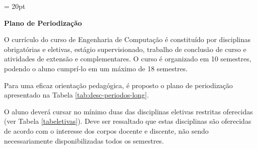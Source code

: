 \documentclass[oneside,envcountsame,envcountchap,openany]{svmono}
\begin{document}
\thispagestyle{firstpage} %
\headsep = 20pt
\setlength{\tabcolsep}{5pt} %
\vspace*{2.0cm}

\pagestyle{plain} %

\begin{center}
  \textbf{\LARGE Plano de Periodização}
\end{center}
\vspace*{0.5cm}

O currículo do curso de Engenharia de Computação é constituído por disciplinas obrigatórias e eletivas, estágio supervisionado, trabalho de conclusão de curso e atividades de extensão e complementares. O curso é organizado em 10 semestres, podendo o aluno cumprí-lo em um máximo de 18 semestres.

Para uma eficaz orientação pedagógica, é proposto o plano de periodização apresentado na Tabela \ref{tab:desc-periodos-long}.

O aluno deverá cursar no mínimo duas das disciplinas eletivas restritas oferecidas (ver Tabela \ref{tabeletivas}). Deve ser
ressaltado que estas disciplinas são oferecidas de acordo com o interesse dos corpos
docente e discente, não sendo necessariamente disponibilizadas todos os semestres.
\end{document}
